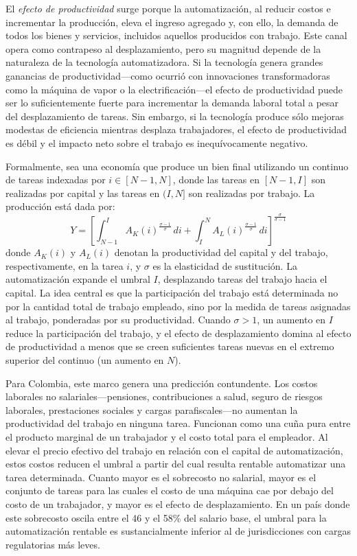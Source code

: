 \documentclass{article}
\begin{document}
El \textit{efecto de productividad} surge porque la automatizaci\'on, al reducir costos e incrementar la producci\'on, eleva el ingreso agregado y, con ello, la demanda de todos los bienes y servicios, incluidos aquellos producidos con trabajo. Este canal opera como contrapeso al desplazamiento, pero su magnitud depende de la naturaleza de la tecnolog\'ia automatizadora. Si la tecnolog\'ia genera grandes ganancias de productividad---como ocurri\'o con innovaciones transformadoras como la m\'aquina de vapor o la electrificaci\'on---el efecto de productividad puede ser lo suficientemente fuerte para incrementar la demanda laboral total a pesar del desplazamiento de tareas. Sin embargo, si la tecnolog\'ia produce s\'olo mejoras modestas de eficiencia mientras desplaza trabajadores, el efecto de productividad es d\'ebil y el impacto neto sobre el trabajo es inequ\'ivocamente negativo.

Formalmente, sea una econom\'ia que produce un bien final utilizando un continuo de tareas indexadas por $i \in [N-1, N]$, donde las tareas en $[N-1, I]$ son realizadas por capital y las tareas en $(I, N]$ son realizadas por trabajo. La producci\'on est\'a dada por:
\begin{equation}
Y = \left[\int_{N-1}^{I} A_K(i)^{\frac{\sigma-1}{\sigma}} \, di + \int_{I}^{N} A_L(i)^{\frac{\sigma-1}{\sigma}} \, di \right]^{\frac{\sigma}{\sigma-1}}
\label{eq:task_production}
\end{equation}
donde $A_K(i)$ y $A_L(i)$ denotan la productividad del capital y del trabajo, respectivamente, en la tarea $i$, y $\sigma$ es la elasticidad de sustituci\'on. La automatizaci\'on expande el umbral $I$, desplazando tareas del trabajo hacia el capital. La idea central es que la participaci\'on del trabajo est\'a determinada no por la cantidad total de trabajo empleado, sino por la medida de tareas asignadas al trabajo, ponderadas por su productividad. Cuando $\sigma > 1$, un aumento en $I$ reduce la participaci\'on del trabajo, y el efecto de desplazamiento domina al efecto de productividad a menos que se creen suficientes tareas nuevas en el extremo superior del continuo (un aumento en $N$).

Para Colombia, este marco genera una predicci\'on contundente. Los costos laborales no salariales---pensiones, contribuciones a salud, seguro de riesgos laborales, prestaciones sociales y cargas parafiscales---no aumentan la productividad del trabajo en ninguna tarea. Funcionan como una cu\~na pura entre el producto marginal de un trabajador y el costo total para el empleador. Al elevar el precio efectivo del trabajo en relaci\'on con el capital de automatizaci\'on, estos costos reducen el umbral a partir del cual resulta rentable automatizar una tarea determinada. Cuanto mayor es el sobrecosto no salarial, mayor es el conjunto de tareas para las cuales el costo de una m\'aquina cae por debajo del costo de un trabajador, y mayor es el efecto de desplazamiento. En un pa\'is donde este sobrecosto oscila entre el 46 y el 58\% del salario base, el umbral para la automatizaci\'on rentable es sustancialmente inferior al de jurisdicciones con cargas regulatorias m\'as leves.
\end{document}
